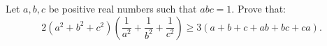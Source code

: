 Let $ a, b, c$ be positive real numbers such that $ abc = 1. $ Prove that:$$ 2 (a^ 2 + b^ 2 + c^ 2) \left (\frac 1 {a^ 2} + \frac 1{b^ 2}+ \frac 1{c^2}\right)\geq 3(a+ b + c + ab + bc + ca).$$